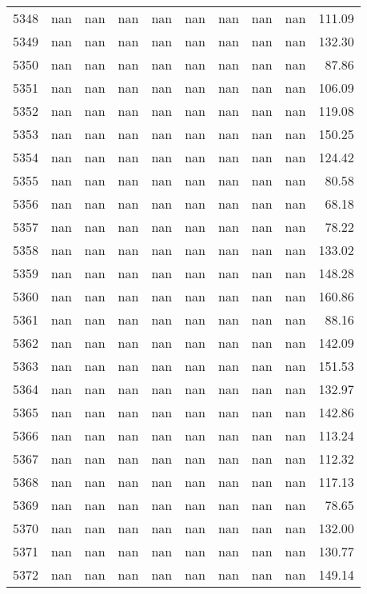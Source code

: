 \begin{tabular}{lrrrrrrrrr}
5348 & nan & nan & nan & nan & nan & nan & nan & nan & 111.09 \\
5349 & nan & nan & nan & nan & nan & nan & nan & nan & 132.30 \\
5350 & nan & nan & nan & nan & nan & nan & nan & nan & 87.86 \\
5351 & nan & nan & nan & nan & nan & nan & nan & nan & 106.09 \\
5352 & nan & nan & nan & nan & nan & nan & nan & nan & 119.08 \\
5353 & nan & nan & nan & nan & nan & nan & nan & nan & 150.25 \\
5354 & nan & nan & nan & nan & nan & nan & nan & nan & 124.42 \\
5355 & nan & nan & nan & nan & nan & nan & nan & nan & 80.58 \\
5356 & nan & nan & nan & nan & nan & nan & nan & nan & 68.18 \\
5357 & nan & nan & nan & nan & nan & nan & nan & nan & 78.22 \\
5358 & nan & nan & nan & nan & nan & nan & nan & nan & 133.02 \\
5359 & nan & nan & nan & nan & nan & nan & nan & nan & 148.28 \\
5360 & nan & nan & nan & nan & nan & nan & nan & nan & 160.86 \\
5361 & nan & nan & nan & nan & nan & nan & nan & nan & 88.16 \\
5362 & nan & nan & nan & nan & nan & nan & nan & nan & 142.09 \\
5363 & nan & nan & nan & nan & nan & nan & nan & nan & 151.53 \\
5364 & nan & nan & nan & nan & nan & nan & nan & nan & 132.97 \\
5365 & nan & nan & nan & nan & nan & nan & nan & nan & 142.86 \\
5366 & nan & nan & nan & nan & nan & nan & nan & nan & 113.24 \\
5367 & nan & nan & nan & nan & nan & nan & nan & nan & 112.32 \\
5368 & nan & nan & nan & nan & nan & nan & nan & nan & 117.13 \\
5369 & nan & nan & nan & nan & nan & nan & nan & nan & 78.65 \\
5370 & nan & nan & nan & nan & nan & nan & nan & nan & 132.00 \\
5371 & nan & nan & nan & nan & nan & nan & nan & nan & 130.77 \\
5372 & nan & nan & nan & nan & nan & nan & nan & nan & 149.14 \\

\end{tabular}
